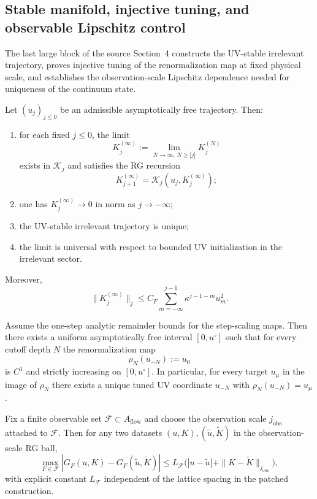 \documentclass[preprint,aip,jmp,amsmath,amssymb,nofootinbib]{revtex4-2}
\begin{document}
\subsection{Stable manifold, injective tuning, and observable Lipschitz control}
The last large block of the source Section~4 constructs the UV-stable irrelevant trajectory, proves injective tuning of the renormalization map at fixed physical scale, and establishes the observation-scale Lipschitz dependence needed for uniqueness of the continuum state.

\begin{theorem}
Let $(u_j)_{j\le 0}$ be an admissible asymptotically free trajectory. Then:
\begin{enumerate}
\item for each fixed $j\le 0$, the limit
\[
K_j^{(\infty)} := \lim_{N\to \infty,\,N\ge |j|} K_j^{(N)}
\]
exists in $\mathcal K_j$ and satisfies the RG recursion
\[
K_{j+1}^{(\infty)} = \mathcal K_j(u_j,K_j^{(\infty)});
\]
\item one has $K_j^{(\infty)}\to 0$ in norm as $j\to -\infty$;
\item the UV-stable irrelevant trajectory is unique;
\item the limit is universal with respect to bounded UV initialization in the irrelevant sector.
\end{enumerate}
Moreover,
\[
\|K_j^{(\infty)}\|_j \le C_F \sum_{m=-\infty}^{j-1}\kappa^{j-1-m}u_m^2.
\]
\end{theorem}

\begin{theorem}
Assume the one-step analytic remainder bounds for the step-scaling maps. Then there exists a uniform asymptotically free interval $[0,u^\circ]$ such that for every cutoff depth $N$ the renormalization map
\[
\rho_N(u_{-N}) := u_0
\]
is $C^1$ and strictly increasing on $[0,u^\circ]$. In particular, for every target $u_\mu$ in the image of $\rho_N$ there exists a unique tuned UV coordinate $u_{-N}$ with $\rho_N(u_{-N})=u_\mu$.
\end{theorem}

\begin{theorem}
Fix a finite observable set $\mathcal F\subset A_{\mathrm{flow}}$ and choose the observation scale $j_{\mathrm{obs}}$ attached to $\mathcal F$. Then for any two datasets $(u,K),(\tilde u,\tilde K)$ in the observation-scale RG ball,
\[
\max_{F\in \mathcal F}|G_F(u,K)-G_F(\tilde u,\tilde K)|
\le L_{\mathcal F}\bigl(|u-\tilde u|+\|K-\tilde K\|_{j_{\mathrm{obs}}}\bigr),
\]
with explicit constant $L_{\mathcal F}$ independent of the lattice spacing in the patched construction.
\end{theorem}
\end{document}
